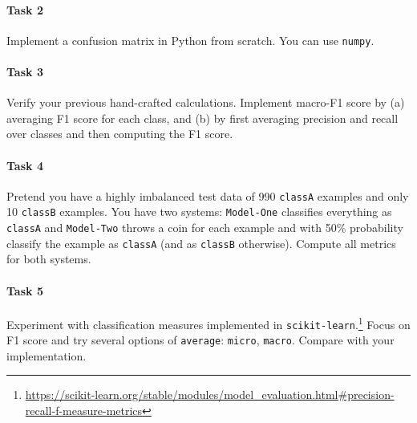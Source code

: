 \documentclass[11pt,a4wide,oneside]{article}
\newif\ifsolution
\begin{document}
\ifsolution
\begin{align*}
	P_\text{NN} &= \frac{25}{25+3} &= 0.89 \\
	R_\text{NN} &= \frac{25}{25+6} &= 0.81 \\
	F1_\text{NN} &= \frac{2 \cdot 0.89 \cdot 0.81}{0.89 + 0.81} &= 0.85 \\[0.75em]
	P_\text{VB} &= \frac{15}{15+11} &= 0.58 \\
	R_\text{VB} &= \frac{15}{15+14} &= 0.52 \\
	F1_\text{VB} &= \frac{2 \cdot 0.58 \cdot 0.52}{0.58 + 0.52} &= 0.55 \\[0.75em]
	P_\text{ADJ} &= \frac{0}{0+13} &= 0.00 \\
	R_\text{ADJ} &= \frac{0}{0+7} &= 0.00 \\
	F1_\text{ADJ} &= \text{undefined} \\    
\end{align*}
\fi

\paragraph{Task 2} Implement a confusion matrix in Python from scratch. You can use \texttt{numpy}.

\paragraph{Task 3} Verify your previous hand-crafted calculations. Implement macro-F1 score by (a) averaging F1 score for each class, and (b) by first averaging precision and recall over classes and then computing the F1 score.

\paragraph{Task 4} Pretend you have a highly imbalanced test data of 990 \texttt{classA} examples and only 10 \texttt{classB} examples. You have two systems: \texttt{Model-One} classifies everything as \texttt{classA} and \texttt{Model-Two} throws a coin for each example and with 50\% probability classify the example as \texttt{classA} (and as \texttt{classB} otherwise). Compute all metrics for both systems.

\paragraph{Task 5} Experiment with classification measures implemented in \texttt{scikit-learn}.\footnote{\url{https://scikit-learn.org/stable/modules/model_evaluation.html#precision-recall-f-measure-metrics}} Focus on F1 score and try several options of \texttt{average}: \texttt{micro}, \texttt{macro}. Compare with your implementation.
\end{document}

